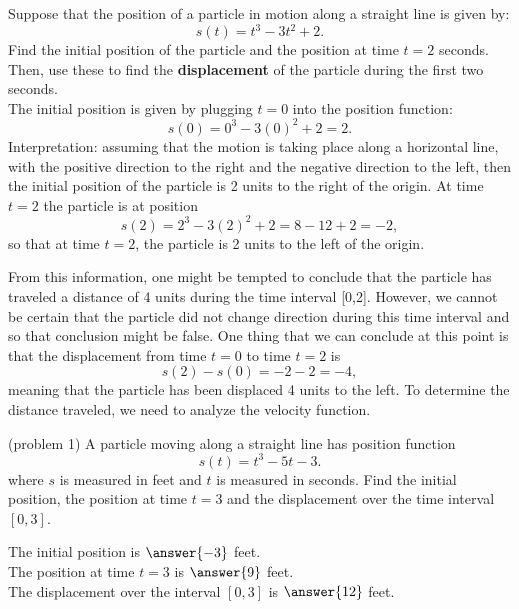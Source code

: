 \documentclass{ximera}
\begin{document}
\begin{example}[example 1]
Suppose that the position of a particle in motion along a straight line is given by:
\[s(t) = t^3 - 3t^2 + 2.\]
Find the initial position of the particle and the position at time $t = 2$ seconds.
Then, use these to find the \textbf{displacement} of the particle during the first two seconds.\\

The initial position is given by plugging $t=0$ into the position function: 
\[s(0) = 0^3 -3(0)^2 + 2 = 2.\]
Interpretation: assuming that the motion is taking place along a horizontal line,
with the positive direction to the right and the negative direction to the left, then the initial position 
of the particle is 2 units to the right of the origin.
At time $t=2$ the particle is at position
\[s(2) = 2^3 -3(2)^2 + 2 = 8 - 12 + 2 = -2,\]
so that at time $t = 2$, the particle is 2 units to the left of the origin.
\begin{center}
\end{center}

From this information, one might be tempted to conclude that the particle has traveled a distance  of 4 units
during the time interval [0,2].  However, we cannot be certain that the particle did not change direction 
during this time interval and so that conclusion might be false. 
One thing that we can conclude at this point is that the displacement from 
time $t = 0$ to time $t = 2$ is
\[s(2) - s(0) = -2 - 2 = -4,\]
meaning that the particle has been displaced 4 units to the left. To determine the distance traveled, we need to analyze the velocity function.  




\end{example}



\begin{problem}(problem 1)
A particle moving along a straight line has position function
\[s(t) = t^3 - 5t -3.\]
where $s$ is measured in feet and $t$ is measured in seconds.
Find the initial position, the position at time $t = 3$ 
and the displacement over the time interval $[0,3]$.

The initial position is $\answer{-3}$ feet.\\
The position at time $t=3$ is $\answer{9}$ feet.\\
The displacement over the interval $[0,3]$ is $\answer{12}$ feet.\\

\end{problem}
\end{document}
